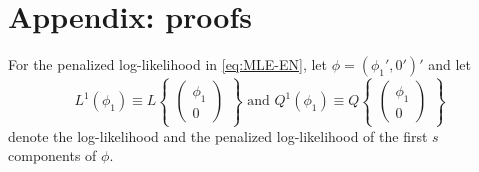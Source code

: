 \section{Appendix: proofs}
For the penalized log-likelihood in \eqref{eq:MLE-EN}, let $\phi=(\phi_1',0')'$ and let $$L^1(\phi_1)\equiv L\begin{Bmatrix}\begin{pmatrix}
\phi_1
\\ 0
\end{pmatrix}\end{Bmatrix} \text{ and } Q^1(\phi_1)\equiv Q
\begin{Bmatrix}
\begin{pmatrix}
\phi_1
\\ 0
\end{pmatrix}
\end{Bmatrix}$$ denote the log-likelihood and the penalized log-likelihood of the first $s$ components of $\phi$.


